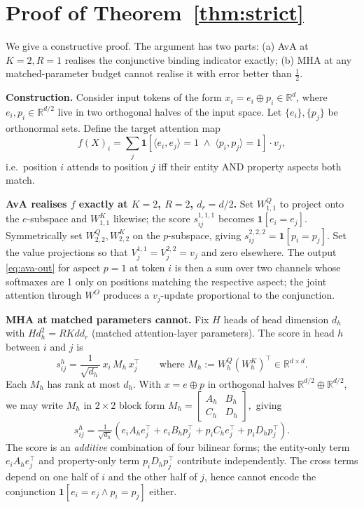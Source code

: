 \documentclass{article}
\newcommand{\R}{\mathbb{R}}
\begin{document}
\section{Proof of Theorem~\ref{thm:strict}}
\label{app:separation-proof}

We give a constructive proof. The argument has two parts: (a) AvA at
$K{=}2, R{=}1$ realises the conjunctive binding indicator exactly;
(b) MHA at any matched-parameter budget cannot realise it with error
better than $\tfrac{1}{2}$.

\textbf{Construction.}
Consider input tokens of the form $x_i = e_i \oplus p_i \in \R^d$,
where $e_i, p_i \in \R^{d/2}$ live in two orthogonal halves of the
input space. Let $\{e_i\}, \{p_j\}$ be orthonormal sets. Define the
target attention map
\[
  f(X)_i = \sum_j \mathbf{1}\!\left[ \langle e_i, e_j \rangle = 1
                                \;\wedge\; \langle p_i, p_j \rangle = 1 \right]
                   \cdot v_j,
\]
i.e.\ position $i$ attends to position $j$ iff their entity AND
property aspects both match.

\textbf{AvA realises $f$ exactly at $K{=}2$, $R{=}2$, $d_r{=}d/2$.}
Set $W^Q_{1, 1}$ to project onto the $e$-subspace and $W^K_{1, 1}$
likewise; the score $s^{1,1,1}_{ij}$ becomes $\mathbf{1}[e_i = e_j]$.
Symmetrically set $W^Q_{2, 2}, W^K_{2, 2}$ on the $p$-subspace, giving
$s^{2,2,2}_{ij} = \mathbf{1}[p_i = p_j]$. Set the value projections so
that $V^{1,1}_j = V^{2,2}_j = v_j$ and zero elsewhere. The output
\eqref{eq:ava-out} for aspect $p{=}1$ at token $i$ is then a sum over
two channels whose softmaxes are 1 only on positions matching the
respective aspect; the joint attention through $W^O$ produces a
$v_j$-update proportional to the conjunction.

\textbf{MHA at matched parameters cannot.} Fix $H$ heads of head
dimension $d_h$ with $H d_h^2 = R K d d_r$ (matched attention-layer
parameters). The score in head $h$ between $i$ and $j$ is
\[
  s^h_{ij} = \frac{1}{\sqrt{d_h}}\, x_i\, M_h\, x_j^\top
  \qquad \text{where } M_h := W^Q_h (W^K_h)^\top \in \R^{d \times d}.
\]
Each $M_h$ has rank at most $d_h$. With $x = e \oplus p$ in
orthogonal halves $\R^{d/2} \oplus \R^{d/2}$, we may write $M_h$ in
$2{\times}2$ block form
\(
  M_h = \begin{bmatrix} A_h & B_h \\ C_h & D_h \end{bmatrix},
\)
giving
\[
  s^h_{ij} = \tfrac{1}{\sqrt{d_h}}\!\left(
    e_i A_h e_j^\top
  + e_i B_h p_j^\top
  + p_i C_h e_j^\top
  + p_i D_h p_j^\top \right).
\]
The score is an \emph{additive} combination of four bilinear forms;
the entity-only term $e_i A_h e_j^\top$ and property-only term
$p_i D_h p_j^\top$ contribute independently. The cross terms depend
on one half of $i$ and the other half of $j$, hence cannot encode the
conjunction $\mathbf{1}[e_i=e_j \wedge p_i=p_j]$ either.
\end{document}
